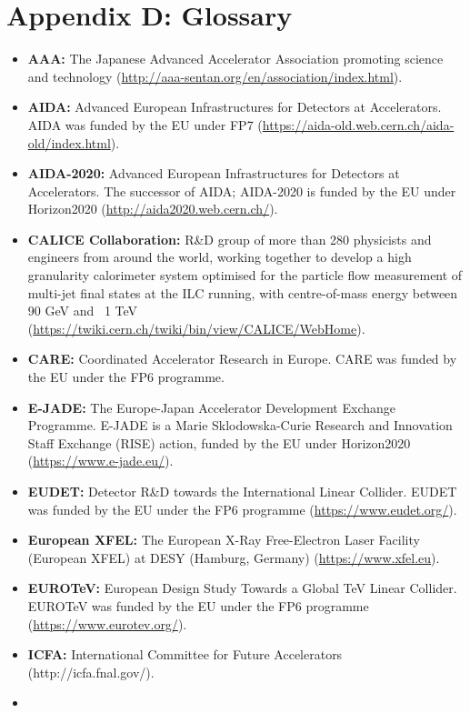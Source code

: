 \documentclass[%
 reprint,
 floatfix,
 amsmath,amssymb,
 aps,
]{revtex4-1}
\begin{document}
\section*{\label{Appendix4} \Large{Appendix D: Glossary} }
\begin{itemize}
\item
\textbf{AAA:} The Japanese Advanced Accelerator Association promoting science and technology (\url{http://aaa-sentan.org/en/association/index.html}).
\item
\textbf{AIDA:} Advanced European Infrastructures for Detectors at Accelerators. AIDA was funded by the EU under FP7 (\url{https://aida-old.web.cern.ch/aida-old/index.html}).
\item
\textbf{AIDA-2020:} Advanced European Infrastructures for Detectors at Accelerators. The successor of AIDA; AIDA-2020 is funded by the EU under Horizon2020 (\url{http://aida2020.web.cern.ch/}).
\item
\textbf{CALICE Collaboration:} R\&D group of more than 280 physicists and engineers from around the world, working together to develop a high granularity calorimeter system optimised for the particle flow measurement of multi-jet final states at the ILC running, with centre-of-mass energy between 90 GeV and ~1 TeV (\url{https://twiki.cern.ch/twiki/bin/view/CALICE/WebHome}).
\item
\textbf{CARE:} Coordinated Accelerator Research in Europe. CARE was funded by the EU under the FP6 programme.
\item
\textbf{E-JADE:} The Europe-Japan Accelerator Development Exchange Programme. E-JADE is a Marie Sklodowska-Curie Research and Innovation Staff Exchange (RISE) action, funded by the EU under Horizon2020 (\url{https://www.e-jade.eu/}).
\item
\textbf{EUDET:} Detector R\&D towards the International Linear Collider. EUDET was funded by the EU under the FP6 programme (\url{https://www.eudet.org/}).
\item
\textbf{European XFEL:} The European X-Ray Free-Electron Laser Facility (European XFEL) at DESY (Hamburg, Germany) (\url{https://www.xfel.eu}).
\item
\textbf{EUROTeV:} European Design Study Towards a Global TeV Linear Collider. EUROTeV was funded by the EU under the FP6 programme (\url{https://www.eurotev.org/}).
\item
\textbf{ICFA:} International Committee for Future Accelerators (http://icfa.fnal.gov/).
\item

\end{itemize}
\end{document}
